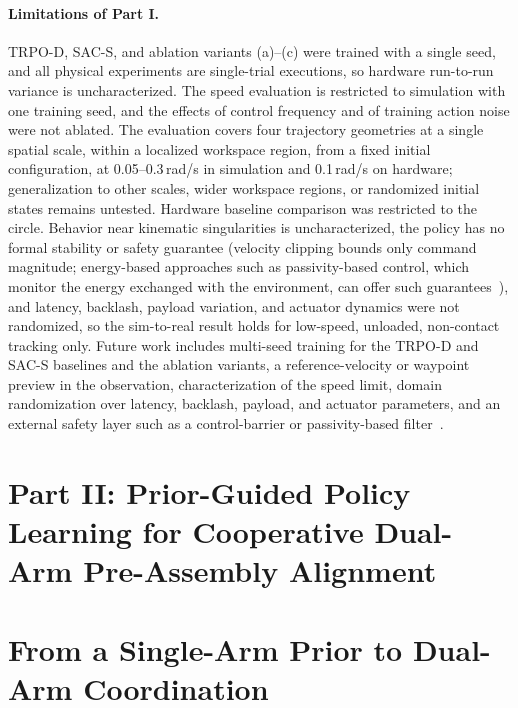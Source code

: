 \paragraph{Limitations of Part I.}
TRPO-D, SAC-S, and ablation variants (a)--(c) were trained with a single seed, and all physical
experiments are single-trial executions, so hardware run-to-run variance is uncharacterized. The
speed evaluation is restricted to simulation with one training seed, and the effects of control
frequency and of training action noise were not ablated. The evaluation covers four trajectory
geometries at a single spatial scale, within a localized workspace region, from a fixed initial
configuration, at 0.05--0.3\,rad/s in simulation and 0.1\,rad/s on hardware; generalization to other
scales, wider workspace regions, or randomized initial states remains untested. Hardware baseline
comparison was restricted to the circle. Behavior near kinematic singularities is uncharacterized,
the policy has no formal stability or safety guarantee (velocity clipping bounds only command
magnitude; energy-based approaches such as passivity-based control, which monitor the energy
exchanged with the environment, can offer such guarantees~\citep{khan2025quantum}), and latency,
backlash, payload variation, and actuator dynamics were not randomized, so the sim-to-real result
holds for low-speed, unloaded, non-contact tracking only. Future work includes multi-seed training
for the TRPO-D and SAC-S baselines and the ablation variants, a reference-velocity or waypoint
preview in the observation, characterization of the speed limit, domain randomization over latency,
backlash, payload, and actuator parameters, and an external safety layer such as a control-barrier
or passivity-based filter~\citep{khan2025quantum}.

\section*{Part II: Prior-Guided Policy Learning for Cooperative Dual-Arm Pre-Assembly Alignment}

\section{From a Single-Arm Prior to Dual-Arm Coordination}\label{sec:alpha_formulation}

